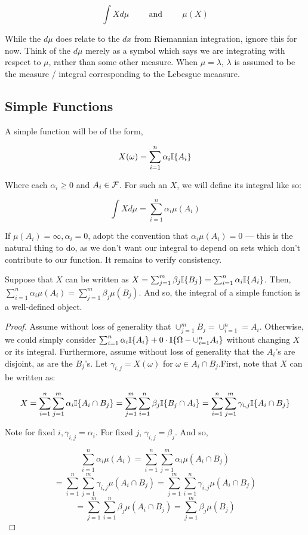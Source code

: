 \[ \int X d\mu \hspace{1cm} \text{and} \hspace{1cm} \mu(X) \]

While the $d\mu$ does relate to the $dx$ from Riemannian integration, ignore this for now. 
Think of the $d\mu$ merely as a symbol which says we are integrating with respect to 
$\mu$, rather than some other measure. When $\mu = \lambda$, $\lambda$ is assumed to be the 
measure / integral corresponding to the Lebesgue meaasure.

\subsection{Simple Functions}

A simple function will be of the form, 

\[ X(\omega) = \sum_{i=1}^n \alpha_i \mathbb I\{A_i\} \]

Where each $\alpha_i \geq 0$ and $A_i \in \mathcal F$. For such an $X$, we will 
define its integral like so:

\[ \int X d\mu = \sum_{i=1}^n \alpha_i \mu(A_i) \]

If $\mu(A_i) = \infty, \alpha_i = 0$, adopt the convention that 
$\alpha_i \mu(A_i) = 0$ — this is the natural thing to do, as we don't want 
our integral to depend on sets which don't contribute to our function. It remains to verify consistency.

\begin{Proposition} 
    Suppose that $X$ can be written as $X = \sum_{j=1}^m \beta_j \mathbb I\{B_j\} =  \sum_{i=1}^n \alpha_i \mathbb I\{A_i\}$. 
Then, $\sum_{i=1}^n \alpha_i \mu(A_i) = \sum_{j=1}^m \beta_j \mu(B_j)$.
And so, the integral of a simple function is a well-defined object.
\end{Proposition}

\begin{proof}

Assume without loss of generality that $\cup_{j=1}^m B_j = \cup_{i=1}^n = A_i$. 
Otherwise, we could simply consider $\sum_{i=1}^n \alpha_i \mathbb I\{A_i\} + 0 \cdot \mathbb I\{\Omega - \cup_{i=1}^n A_i \}$ 
without changing $X$ or its integral. Furthermore, assume without loss of generality that the 
$A_i$'s are disjoint, as are the $B_j$'s. Let $\gamma_{i,j} = X(\omega)$ for $\omega \in A_i \cap B_j$.First, note that $X$ can be written as: 

\[ X = \sum_{i=1}^n \sum_{j=1}^m \alpha_i \mathbb I\{A_i \cap B_j\} =  \sum_{j=1}^m  \sum_{i=1}^n \beta_j \mathbb I\{B_j \cap A_i \} = \sum_{i=1}^n \sum_{j=1}^m \gamma_{i,j} \mathbb I\{A_i \cap B_j\}\]

Note for fixed $i, \gamma_{i,j} = \alpha_i$. For fixed $j$, $\gamma_{i,j} = \beta_j$. And so,

\[ \sum_{i=1}^n \alpha_i \mu(A_i) = \sum_{i=1}^n \sum_{j=1}^m \alpha_i \mu(A_i \cap B_j) \]
\[ = \sum_{i=1}^n \sum_{j=1}^m \gamma_{i,j} \mu(A_i \cap B_j) =  \sum_{j=1}^m \sum_{i=1}^n\gamma_{i,j} \mu(A_i \cap B_j) \]
\[ = \sum_{j=1}^m \sum_{i=1}^n\beta_j \mu(A_i \cap B_j) = \sum_{j=1}^m \beta_j \mu(B_j) \]

\end{proof}

